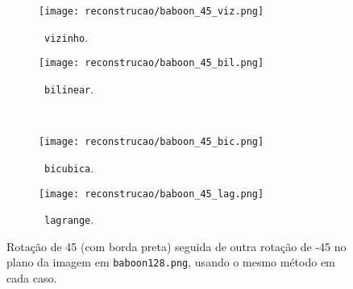 \begin{figure}[H]
    \centering
    \begin{subfigure}{0.33\textwidth}
        \centering
        \texttt{[image: reconstrucao/baboon\_45\_viz.png]}
        \caption{~\texttt{vizinho}.}
    \end{subfigure}%
    \hspace{8pt}
    \begin{subfigure}{0.33\textwidth}
        \centering
        \texttt{[image: reconstrucao/baboon\_45\_bil.png]}
        \caption{~\texttt{bilinear}.}
    \end{subfigure}
    \\[8pt]
    \begin{subfigure}{0.33\textwidth}
        \centering
        \texttt{[image: reconstrucao/baboon\_45\_bic.png]}
        \caption{~\texttt{bicubica}.}
    \end{subfigure}%
    \hspace{8pt}%
    \begin{subfigure}{0.33\textwidth}
        \centering
        \texttt{[image: reconstrucao/baboon\_45\_lag.png]}
        \caption{~\texttt{lagrange}.}
    \end{subfigure}

    \caption{Rotação de 45\textdegree{} (com borda preta) seguida de outra rotação de -45\textdegree{} no plano da imagem em \texttt{baboon128.png}, usando o mesmo método em cada caso.}
    \label{fig:rec:x2}
\end{figure}